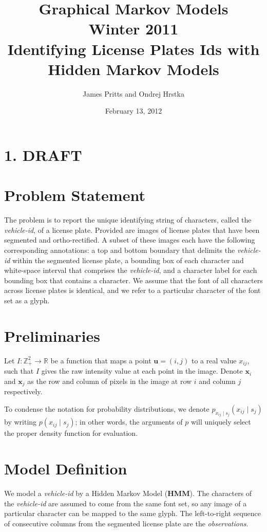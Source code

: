 \documentclass[a4paper,12pt]{article}
\title { \normalsize Graphical Markov Models \\ Winter 2011 \\
 \vspace{10mm} {\bf Identifying License Plates Ids with Hidden Markov
    Models } }
\author{\normalsize James Pritts and Ondrej Hrstka }
\date{ \small February 13, 2012 }
\begin{document}
\maketitle

\pagestyle{empty} 
\section*{1. DRAFT}
\section{Problem Statement}
The problem is to report the unique identifying string of characters,
called the \emph{vehicle-id}, of a license plate.  Provided are images
of license plates that have been segmented and ortho-rectified. A
subset of these images each have the following corresponding
annotations: a top and bottom boundary that delimits the
\emph{vehicle-id} within the segmented license plate, a bounding box
of each character and white-space interval that comprises the
\emph{vehicle-id}, and a character label for each bounding box that
contains a character.  We assume that the font of all characters
across license plates is identical, and we refer to a particular
character of the font set as a glyph.

\section{Preliminaries}
Let $I\colon \mathbb{Z}^2_+ \to \mathbb{R}$ be a function that maps a
point $\mathbf{u} = (i,j)$ to a real value $x_{ij}$, such that $I$
gives the raw intensity value at each point in the image.  Denote
$\mathbf{x}_i$ and $\mathbf{x}_j$ as the row and column of pixels in
the image at row $i$ and column $j$ respectively.

To condense the notation for probability distributions, we denote
$p_{x_{ij} \mid s_j}(x_{ij} \mid s_j)$ by writing $p(x_{ij} \mid
s_j)$; in other words, the arguments of $p$ will uniquely select the
proper density function for evaluation.

\section{Model Definition}
We model a \emph{vehicle-id} by a Hidden Markov Model (\textbf{HMM}).
The characters of the \emph{vehicle-id} are assumed to come from the
same font set, so any image of a particular character can be mapped to
the same glyph.  The left-to-right sequence of consecutive columns
from the segmented license plate are the \emph{observations}.
\end{document}
